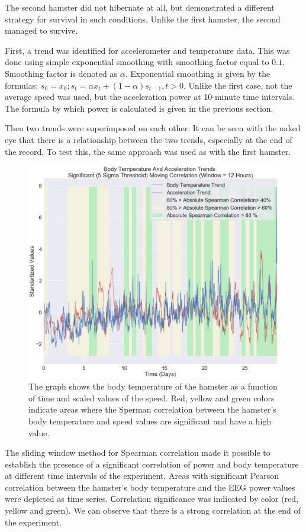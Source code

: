 \documentclass[14pt,a4paper]{scrartcl}
\begin{document}
The second hamster did not hibernate at all, but demonstrated a different strategy for survival in such conditions. Unlike the first hamster, the second managed to survive. 

First, a trend was identified for accelerometer and temperature data. This was done using simple exponential smoothing with smoothing factor equal to $0.1$. Smoothing factor is denoted as $\alpha$. Exponential smoothing is given by the formulas: $s_0 = x_0; s_t = \alpha x_t + (1 - \alpha) s_{t-1}, t > 0$. Unlike the first case, not the average speed was used, but the acceleration power at 10-minute time intervals. The formula by which power is calculated is given in the previous section.

Then two trends were superimposed on each other. It can be seen with the naked eye that there is a relationship between the two trends, especially at the end of the record. To test this, the same approach was used as with the first hamster.

\begin{figure}[H]
\centering
\includegraphics[width=0.7\linewidth]{exp2_3.png}
\caption{The graph shows the body temperature of the hamster as a function of time and scaled values of the speed. Red, yellow and green colors indicate areas where the Sperman correlation between the hamster's body temperature and speed values are significant and have a high value.}\label{fig:exp2_3}
\end{figure}

The sliding window method for Spearman correlation made it possible to establish the presence of a significant correlation of power and body temperature at different time intervals of the experiment. Areas with significant Pearson correlation between the hamster's body temperature and the EEG power values were depicted as time series. Сorrelation significance was indicated by color (red, yellow and green). We can observe that there is a strong correlation at the end of the experiment. 
\end{document}

